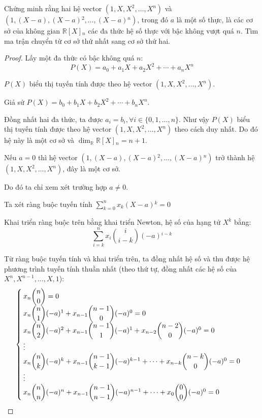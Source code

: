 \begin{exercise}
    Chứng minh rằng hai hệ vector $(1, X, X^{2}, \ldots, X^{n})$ và $(1, (X - a), (X - a){}^{2}, \ldots, (X - a){}^{n})$, trong đó $a$ là một số thực, là các cơ sở của không gian $\mathbb{R}[X]{}_{n}$ các đa thức hệ số thực với bậc không vượt quá $n$. Tìm ma trận chuyển từ cơ sở thứ nhất sang cơ sở thứ hai.
\end{exercise}

\begin{proof}Lấy một đa thức có bậc không quá $n$:
    \[ P(X) = a_{0} + a_{1}X + a_{2}X^{2} + \cdots + a_{n}X^{n} \]
    
    $P(X)$ biểu thị tuyến tính được theo hệ vector $(1, X, X^{2}, \ldots, X^{n})$.
    
    Giả sử $P(X) = b_{0} + b_{1}X + b_{2}X^{2} + \cdots + b_{n}X^{n}$.
    
    Đồng nhất hai đa thức, ta được $a_{i} = b_{i}, \forall i\in\{0, 1, \ldots, n\}$. Như vậy $P(X)$ biểu thị tuyến tính được theo hệ vector $(1, X, X^{2}, \ldots, X^{n})$ theo cách duy nhất. Do đó hệ này là một cơ sở và $\dim_{\mathbb{R}}\mathbb{R}[X]{}_{n} = n + 1$.

    Nếu $a = 0$ thì hệ vector $(1, (X - a), (X - a){}^{2}, \ldots, (X - a){}^{n})$ trở thành hệ $(1, X, X^{2}, \ldots, X^{n})$, đây là một cơ sở.
    
    Do đó ta chỉ xem xét trường hợp $a\ne 0$.
    
    Ta xét ràng buộc tuyến tính $\displaystyle\sum^{n}_{k=0}x_{k}(X-a){}^{k} = 0$
    
    Khai triển ràng buộc trên bằng khai triển Newton, hệ số của hạng tử $X^{k}$ bằng:
    \[ \sum^{n}_{i=k}x_{i}\binom{i}{i-k}(-a){}^{i-k} \]
    
    Từ ràng buộc tuyến tính và khai triển trên, ta đồng nhất hệ số và thu được hệ phương trình tuyến tính thuần nhất (theo thứ tự, đồng nhất các hệ số của $X^{n}, X^{n-1}, \ldots, X, 1$):
    \[
        \begin{cases}
            x_{n}\dbinom{n}{0} = 0                                                                                              \\
            x_{n}\dbinom{n}{1}(-a){}^{1} + x_{n-1}\dbinom{n-1}{0}(-a){}^{0} = 0                                                 \\
            x_{n}\dbinom{n}{2}(-a){}^{2} + x_{n-1}\dbinom{n-1}{1}(-a){}^{1} + x_{n-2}\dbinom{n-2}{0}(-a){}^{0} = 0              \\
            \vdots                                                                                                              \\
            x_{n}\dbinom{n}{k}(-a){}^{k} + x_{n-1}\dbinom{n-1}{k-1}(-a){}^{k-1} + \cdots + x_{n-k}\dbinom{n-k}{0}(-a){}^{0} = 0 \\
            \vdots                                                                                                              \\
            x_{n}\dbinom{n}{n}(-a){}^{n} + x_{n-1}\dbinom{n-1}{n-1}(-a){}^{n-1} + \cdots + x_{0}\dbinom{0}{0}(-a){}^{0} = 0
        \end{cases}
    \]
    

\end{proof}
